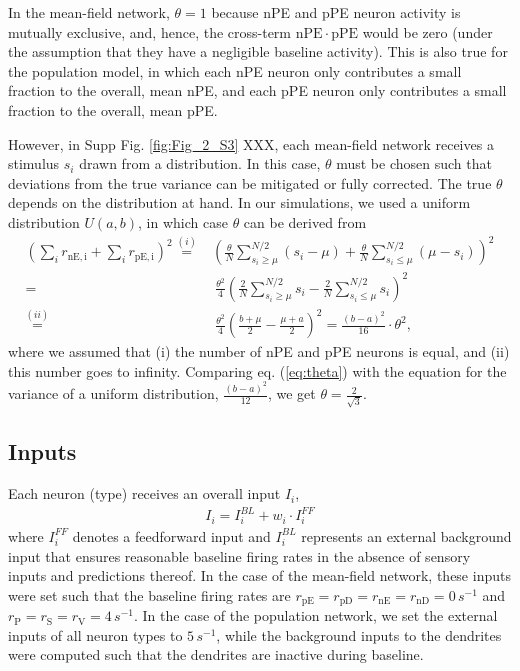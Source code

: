 \documentclass[10pt,a4paper,draft]{article}
\begin{document}
In the mean-field network, $\theta = 1$ because nPE and pPE neuron activity is mutually exclusive, and, hence, the cross-term $\mathrm{nPE}\cdot\mathrm{pPE}$ would be zero (under the assumption that they have a negligible baseline activity). This is also true for the population model, in which each nPE neuron only contributes a small fraction to the overall, mean nPE, and each pPE neuron only contributes a small fraction to the overall, mean pPE. 

However, in Supp Fig. \ref{fig:Fig_2_S3} XXX, each mean-field network receives a stimulus $s_i$ drawn from a distribution. In this case, $\theta$ must be chosen such that deviations from the true variance can be mitigated or fully corrected. The true $\theta$ depends on the distribution at hand. In our simulations, we used a uniform distribution $U(a,b)$, in which case $\theta$ can be derived from
%
\begin{align}
\left( \sum_{i} r_\mathrm{nE,i} + \sum_{i} r_\mathrm{pE,i}\right)^2 \overset{(i)}{=} & \left( \frac{\theta}{N}  \sum_{s_i \geq \mu}^{N/2} (s_i - \mu) + \frac{\theta}{N}  \sum_{s_i \leq \mu}^{N/2} (\mu - s_i )\right)^2 \nonumber \\
%
=&\ \frac{\theta^2}{4} \left( \frac{2}{N} \sum_{s_i \geq \mu}^{N/2} s_i - \frac{2}{N} \sum_{s_i \leq \mu}^{N/2} s_i\right)^2\nonumber\\
%
\overset{(ii)}{=}&\ \frac{\theta^2}{4} \left( \frac{b+\mu}{2} - \frac{\mu + a}{2} \right)^2 = \frac{(b-a)^2}{16} \cdot \theta^2,
\label{eq:theta}
\end{align}
%
where we assumed that (i) the number of nPE and pPE neurons is equal, and (ii) this number goes to infinity. Comparing eq. (\ref{eq:theta}) with the equation for the variance of a uniform distribution, $\frac{(b-a)^2}{12}$, we get $\theta = \frac{2}{\sqrt{3}}$.

\subsection{Inputs}
%
Each neuron (type) receives an overall input $I_i$,
%
\begin{align*}
I_i = I_i^{BL} + w_i \cdot I_{i}^{FF}
\end{align*}
%
where $I_{i}^{FF}$ denotes a feedforward input and $I_i^{BL}$ represents an external background input that ensures reasonable baseline firing rates in the absence of sensory inputs and predictions thereof. In the case of the mean-field network, these inputs were set such that the baseline firing rates are $r_\mathrm{pE}=r_\mathrm{pD}=r_\mathrm{nE}=r_\mathrm{nD}=0\, s^{-1}$ and $r_\mathrm{P} = r_\mathrm{S}=r_\mathrm{V}=4\, s^{-1}$. In the case of the population network, we set the external inputs of all neuron types to $5\, s^{-1}$, while the background inputs to the dendrites were computed such that the dendrites are inactive during baseline.
\end{document}
